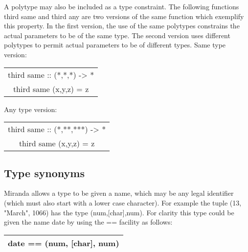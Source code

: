 \documentclass[11pt]{article}
\begin{document}
A polytype may also be included as a type constraint. The following functions
third same and third any are two versions of the same function which exemplify
this property. In the first version, the use of the same polytypes constrains the actual
parameters to be of the same type. The second version uses different polytypes
to permit actual parameters to be of different types.
Same type version:


\begin{center}
    
    \begin{tabular}{|c|}
    \hline
         third same :: (*,*,*) -> *\\
third same (x,y,z) = z\\
\hline

    \end{tabular}
\end{center}


Any type version:

\begin{center}
    
    \begin{tabular}{|c|}
    \hline
         third same :: (*,**,***) -> *\\
third same (x,y,z) = z\\
\hline

    \end{tabular}
\end{center}

\subsection{Type synonyms}

Miranda allows a type to be given
a name, which may be any legal identifier (which
must also start with a lower case character). For example the tuple (13, "March",
1066) has the type (num,[char],num). For clarity this type could be given the
name date by using the == facility as follows:

\begin{center}
    \begin{tabular}{|c|}
    \hline
    
    date == (num, [char], num)\\

\hline
    \end{tabular}
\end{center}
\end{document}

